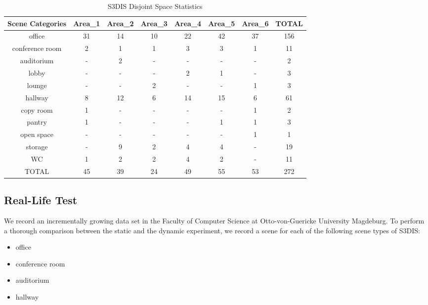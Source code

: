\documentclass[main.tex]{subfiles}
\begin{document}
\begin{table}[!ht]
    \centering
    \begin{tabular}{c|c|c|c|c|c|c|c}
        \hline
        Scene Categories & Area\_1 & Area\_2 & Area\_3 & Area\_4 & Area\_5 & Area\_6 & TOTAL \\ \hline
        office           & 31      & 14      & 10      & 22      & 42      & 37      & 156   \\ \hline
        conference room  & 2       & 1       & 1       & 3       & 3       & 1       & 11    \\ \hline
        auditorium       & -       & 2       & -       & -       & -       & -       & 2     \\ \hline
        lobby            & -       & -       & -       & 2       & 1       & -       & 3     \\ \hline
        lounge           & -       & -       & 2       & -       & -       & 1       & 3     \\ \hline
        hallway          & 8       & 12      & 6       & 14      & 15      & 6       & 61    \\ \hline
        copy room        & 1       & -       & -       & -       & -       & 1       & 2     \\ \hline
        pantry           & 1       & -       & -       & -       & 1       & 1       & 3     \\ \hline
        open space       & -       & -       & -       & -       & -       & 1       & 1     \\ \hline
        storage          & -       & 9       & 2       & 4       & 4       & -       & 19    \\ \hline
        WC               & 1       & 2       & 2       & 4       & 2       & -       & 11    \\ \hline
        TOTAL            & 45      & 39      & 24      & 49      & 55      & 53      & 272   \\
    \end{tabular}
    \caption{S3DIS Disjoint Space Statistics}
    \label{tab:stanfordStats}
\end{table}

\subsection{Real-Life Test}
We record an incrementally growing data set in the Faculty of Computer Science at Otto-von-Guericke University Magdeburg.
To perform a thorough comparison between the static and the dynamic experiment, we record a scene for each of the following scene types of S3DIS:
\begin{itemize}
    \item office
    \item conference room
    \item auditorium
    \item hallway
\end{itemize}
\end{document}
